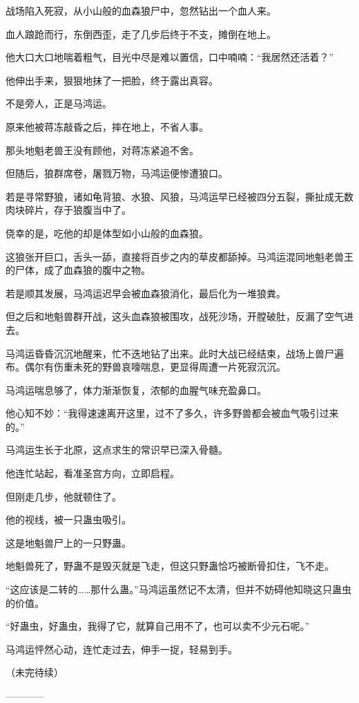 \begin{this_body}
战场陷入死寂，从小山般的血森狼尸中，忽然钻出一个血人来。

血人踉跄而行，东倒西歪，走了几步后终于不支，摊倒在地上。

他大口大口地喘着粗气，目光中尽是难以置信，口中喃喃：“我居然还活着？”

他伸出手来，狠狠地抹了一把脸，终于露出真容。

不是旁人，正是马鸿运。

原来他被蒋冻敲昏之后，摔在地上，不省人事。

那头地魁老兽王没有顾他，对蒋冻紧追不舍。

但随后，狼群席卷，屠戮万物，马鸿运便惨遭狼口。

若是寻常野狼，诸如龟背狼、水狼、风狼，马鸿运早已经被四分五裂，撕扯成无数肉块碎片，存于狼腹当中了。

侥幸的是，吃他的却是体型如小山般的血森狼。

这狼张开巨口，舌头一舔，直接将百步之内的草皮都舔掉。马鸿运混同地魁老兽王的尸体，成了血森狼的腹中之物。

若是顺其发展，马鸿运迟早会被血森狼消化，最后化为一堆狼粪。

但之后和地魁兽群开战，这头血森狼被围攻，战死沙场，开膛破肚，反漏了空气进去。

马鸿运昏昏沉沉地醒来，忙不迭地钻了出来。此时大战已经结束，战场上兽尸遍布。偶尔有伤重未死的野兽哀嚎喘息，更显得周遭一片死寂沉沉。

马鸿运喘息够了，体力渐渐恢复，浓郁的血腥气味充盈鼻口。

他心知不妙：“我得速速离开这里，过不了多久，许多野兽都会被血气吸引过来的。”

马鸿运生长于北原，这点求生的常识早已深入骨髓。

他连忙站起，看准圣宫方向，立即启程。

但刚走几步，他就顿住了。

他的视线，被一只蛊虫吸引。

这是地魁兽尸上的一只野蛊。

地魁兽死了，野蛊不是毁灭就是飞走，但这只野蛊恰巧被断骨扣住，飞不走。

“这应该是二转的……那什么蛊。”马鸿运虽然记不太清，但并不妨碍他知晓这只蛊虫的价值。

“好蛊虫，好蛊虫，我得了它，就算自己用不了，也可以卖不少元石呢。”

马鸿运怦然心动，连忙走过去，伸手一捉，轻易到手。

（未完待续）

------------

\end{this_body}

